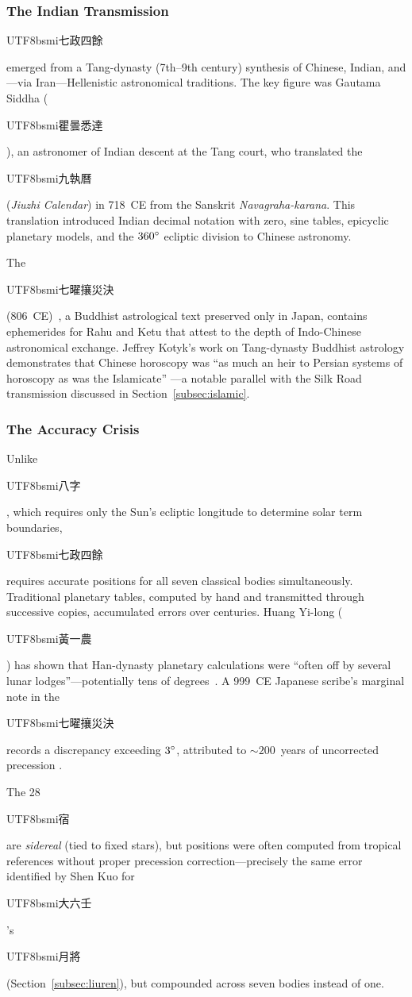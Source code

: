 \documentclass[10pt,a4paper]{article}
\newcommand{\zh}[1]{\begin{CJK}{UTF8}{bsmi}#1\end{CJK}}
\begin{document}
\subsubsection{The Indian Transmission}

\zh{七政四餘} emerged from a Tang-dynasty (7th--9th century) synthesis
of Chinese, Indian, and---via Iran---Hellenistic astronomical traditions.
The key figure was Gautama Siddha (\zh{瞿曇悉達}), an astronomer of
Indian descent at the Tang court, who translated the \zh{九執曆}
(\textit{Jiuzhi Calendar}) in 718~CE from the Sanskrit
\textit{Navagraha-karana}. This translation introduced Indian decimal
notation with zero, sine tables, epicyclic planetary models, and the
$360\degree$ ecliptic division to Chinese astronomy.

The \zh{七曜攘災決} (806~CE)~\cite{qiyao_rangzai}, a Buddhist astrological
text preserved only in Japan, contains ephemerides for Rahu and Ketu that
attest to the depth of Indo-Chinese astronomical exchange. Jeffrey Kotyk's work
on Tang-dynasty Buddhist astrology demonstrates that Chinese horoscopy was
``as much an heir to Persian systems of horoscopy as was the
Islamicate'' \cite{kotyk_2017, kotyk_2018}---a notable parallel with the
Silk Road transmission discussed in Section~\ref{subsec:islamic}.

\subsubsection{The Accuracy Crisis}

Unlike \zh{八字}, which requires only the Sun's ecliptic longitude to
determine solar term boundaries, \zh{七政四餘} requires accurate
positions for all seven classical bodies simultaneously. Traditional
planetary tables, computed by hand and transmitted through successive
copies, accumulated errors over centuries. Huang Yi-long (\zh{黃一農})
has shown that Han-dynasty planetary calculations were ``often off by
several lunar lodges''---potentially tens of degrees~\cite{huang_yilong_planets}. A 999~CE Japanese
scribe's marginal note in the \zh{七曜攘災決} records a discrepancy
exceeding $3\degree$, attributed to ${\sim}200$~years of uncorrected
precession \cite{ho_peng_yoke_2003}.

The 28~\zh{宿} are \emph{sidereal} (tied to fixed stars), but positions
were often computed from tropical references without proper precession
correction---precisely the same error identified by Shen Kuo for
\zh{大六壬}'s \zh{月將} (Section~\ref{subsec:liuren}), but compounded
across seven bodies instead of one.
\end{document}
